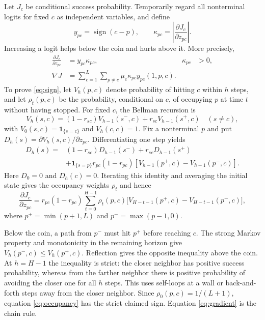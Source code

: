 \documentclass[11pt]{article}
\newcommand{\kap}{\kappa}
\newcommand{\grad}{\nabla}
\begin{document}
Let $J_c$ be conditional success probability. Temporarily regard all
nonterminal logits for fixed $c$ as independent variables, and define
\[
 y_{pc}=\operatorname{sign}(c-p),\qquad
 \kap_{pc}=\left|\frac{\partial J_c}{\partial z_{pc}}\right|.
\]
Increasing a logit helps below the coin and hurts above it. More precisely,
\begin{align}
 \frac{\partial J_c}{\partial z_{pc}}&=y_{pc}\kap_{pc},
       &\kap_{pc}&>0,\label{eq:sign}\\
 \grad J&=\sum_{c=1}^L\sum_{p\ne c}
       \mu_c\kap_{pc}y_{pc}(1,p,c).\label{eq:gradient}
\end{align}
To prove \eqref{eq:sign}, let $V_h(p,c)$ denote probability of hitting $c$
within $h$ steps, and let $\rho_t(p,c)$ be the probability, conditional on $c$,
of occupying $p$ at time $t$ without having stopped. For fixed $c$, the Bellman recursion is
\[
 V_h(s,c)=(1-r_{sc})V_{h-1}(s^-,c)+r_{sc}V_{h-1}(s^+,c)
 \quad(s\ne c),
\]
with $V_0(s,c)=\mathbf1_{\{s=c\}}$ and $V_h(c,c)=1$.
Fix a nonterminal $p$ and put $D_h(s)=\partial V_h(s,c)/\partial z_{pc}$.
Differentiating one step yields
\begin{align*}
 D_h(s)={}&(1-r_{sc})D_{h-1}(s^-)+r_{sc}D_{h-1}(s^+)\\
 &+\mathbf1_{\{s=p\}}r_{pc}(1-r_{pc})
   [V_{h-1}(p^+,c)-V_{h-1}(p^-,c)].
\end{align*}
Here $D_0=0$ and $D_h(c)=0$. Iterating this identity and averaging the initial
state gives the occupancy weights $\rho_t$ and hence
\begin{equation}\label{eq:occupancy}
 \frac{\partial J_c}{\partial z_{pc}}
 =r_{pc}(1-r_{pc})\sum_{t=0}^{H-1}\rho_t(p,c)
 \bigl[V_{H-t-1}(p^+,c)-V_{H-t-1}(p^-,c)\bigr],
\end{equation}
where $p^+=\min(p+1,L)$ and $p^-=\max(p-1,0)$.

Below the coin, a path from $p^-$ must hit $p^+$ before reaching $c$.
The strong Markov property and monotonicity in the remaining horizon give
$V_h(p^-,c)\le V_h(p^+,c)$. Reflection gives the opposite inequality above
the coin. At $h=H-1$ the inequality is strict: the closer neighbor has positive
success probability, whereas from the farther neighbor there is positive
probability of avoiding the closer one for all $h$ steps. This uses self-loops
at a wall or back-and-forth steps away from the closer neighbor. Since
$\rho_0(p,c)=1/(L+1)$, equation \eqref{eq:occupancy} has the strict claimed
sign. Equation \eqref{eq:gradient} is the chain rule.
\end{document}

